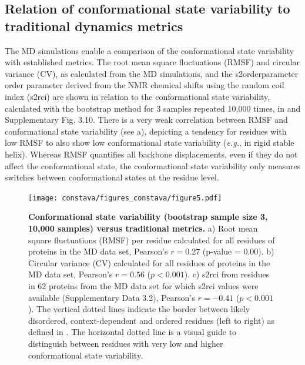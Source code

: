 \subsection{Relation of conformational state variability to traditional dynamics metrics} \label{section:ConfStateVar_vs_Dynamics}

The MD simulations enable a comparison of the conformational state variability with established metrics. The root mean square fluctuations (RMSF) and circular variance (CV), as calculated from the MD simulations, and the \gls{s2orderparameter} order parameter derived from the NMR chemical shifts using the random coil index (\gls{s2rci}) are shown in relation to the conformational state variability, calculated with the bootstrap method for 3 samples repeated 10,000 times, in  and Supplementary Fig. 3.10.
There is a very weak correlation between RMSF and conformational state variability (see  a), depicting a tendency for residues with low RMSF to also show low conformational state variability (\textit{e.g.}, in rigid stable helix). Whereas RMSF quantifies all backbone displacements, even if they do not affect the conformational state, the conformational state variability only measures switches between conformational states at the residue level. 

\begin{figure}[!t]
\texttt{[image: constava/figures\_constava/figure5.pdf]}
\caption{
    \textbf{Conformational state variability (bootstrap sample size 3, 10,000 samples) versus traditional metrics.} 
    a) Root mean square fluctuations (RMSF) per residue calculated for all residues of proteins in the MD data set, Pearson's $r = 0.27 $ (p-value = 0.00).
    b) Circular variance (CV) calculated for all residues of proteins in the MD data set, Pearson's $r = 0.56$ ($p < 0.001$).
    c) \gls{s2rci} from residues in 62 proteins from the MD data set for which \gls{s2rci} values were available (Supplementary Data 3.2),
    Pearson's $r = -0.41$ ($p < 0.001$). The vertical dotted lines indicate the border between likely disordered, context-dependent and ordered residues (left to right) as defined in \cite{cilia_protein_2013}. The horizontal dotted line is a visual guide to distinguish between residues with very low and higher conformational state variability.
}
\label{fig:metrics_vs_confstatevar}
\end{figure}


